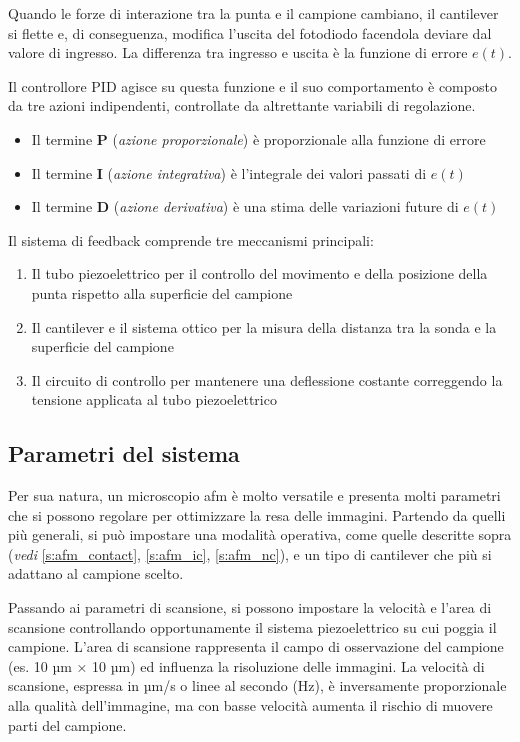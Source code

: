 \documentclass[../main.tex]{subfiles}
\begin{document}
Quando le forze di interazione tra la punta e il campione cambiano, il cantilever si flette e, di conseguenza, modifica l'uscita del fotodiodo facendola deviare dal valore di ingresso. La differenza tra ingresso e uscita è la funzione di errore $e(t)$.

Il controllore PID agisce su questa funzione e il suo comportamento è composto da tre azioni indipendenti, controllate da altrettante variabili di regolazione.\cite{ogata_2010}
\begin{itemize}
	\itemsep0em 
	\item Il termine \textbf{P} (\textit{azione proporzionale}) è proporzionale alla funzione di errore
	\item Il termine \textbf{I} (\textit{azione integrativa}) è l'integrale dei valori passati di $e(t)$
	\item Il termine \textbf{D} (\textit{azione derivativa}) è una stima delle variazioni future di $e(t)$
\end{itemize}

Il sistema di feedback comprende tre meccanismi principali: \cite{parisi}
\begin{enumerate}
	\itemsep0em 
	\item Il tubo piezoelettrico per il controllo del movimento e della posizione della punta rispetto alla superficie del campione
	\item Il cantilever e il sistema ottico per la misura della distanza tra la sonda e la superficie del campione
	\item Il circuito di controllo per mantenere una deflessione costante correggendo la tensione applicata al tubo piezoelettrico
\end{enumerate}

\subsection{Parametri del sistema}

Per sua natura, un microscopio \acrshort{afm} è molto versatile e presenta molti parametri che si possono regolare per ottimizzare la resa delle immagini. Partendo da quelli più generali, si può impostare una modalità operativa, come quelle descritte sopra (\textit{vedi} \ref{s:afm_contact}, \ref{s:afm_ic}, \ref{s:afm_nc}), e un tipo di cantilever che più si adattano al campione scelto.

Passando ai parametri di scansione, si possono impostare la velocità e l'area di scansione controllando opportunamente il sistema piezoelettrico su cui poggia il campione. L'area di scansione rappresenta il campo di osservazione del campione (es. 10 µm × 10 µm) ed influenza la risoluzione delle immagini. La velocità di scansione, espressa in µm/s o linee al secondo (Hz), è inversamente proporzionale alla qualità dell'immagine, ma con basse velocità aumenta il rischio di muovere parti del campione.
\end{document}

